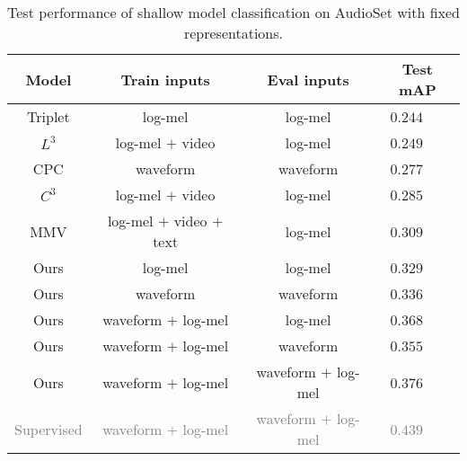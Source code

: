 \documentclass{article}
\newcommand\spv[1]{\textcolor{grey}{#1}}
\begin{document}
\begin{table}[t]
  \caption{Test performance of shallow model classification on AudioSet with fixed representations.}
  \label{tab:benckmark}
  \centering
  \begin{tabular}{ c c c c }
    \toprule
    \textbf{Model} & \textbf{Train inputs} & \textbf{Eval inputs} & \textbf{Test mAP} \\
    \midrule
    Triplet \cite{jansen2018unsupervised} & log-mel  & log-mel        & $0.244$~~~\\
    $L^3$ \cite{arandjelovic2017look} & log-mel $+$ video & log-mel & $0.249$~~~\\
    CPC \cite{wang2020contrastive}                  & waveform   & waveform       & $0.277$~~~\\
$C^3$ \cite{jansen2019coincidence} & log-mel $+$ video & log-mel  & $0.285$~~~\\
    MMV \cite{alayrac2020self} & log-mel $+$ video $+$ text & log-mel & $0.309$~~~\\
    \midrule
    Ours                  & log-mel   & log-mel       & $0.329$~~~\\
    Ours                  & waveform  & waveform        & $0.336$~~~\\
    Ours                  & waveform $+$ log-mel  & log-mel        & $0.368$~~~\\
    Ours                  & waveform $+$ log-mel  & waveform        & $0.355$~~~\\
    Ours                  & waveform $+$ log-mel  & waveform $+$ log-mel        & $\mathbf{0.376}$~~~\\
    \midrule
    \spv{Supervised \cite{kong2020panns}} & \spv{waveform $+$ log-mel} &  \spv{waveform $+$ log-mel}  & \spv{$0.439$}~~~\\
    \bottomrule
  \end{tabular}
  
\end{table}
\end{document}
